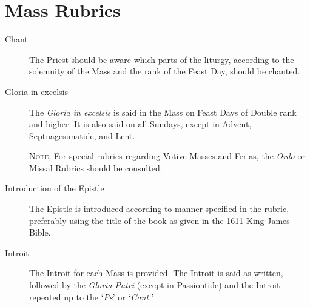 \section{Mass Rubrics}
\begin{description}
    \item[Chant] The Priest should be aware which parts of the liturgy, according to the solemnity of the Mass and the rank of the Feast Day, should be chanted.
    \item[Gloria in excelsis] The \emph{Gloria in excelsis} is said in the Mass on Feast Days of Double rank and higher. It is also said on all Sundays, except in Advent, Septuagesimatide, and Lent.\par
    \textsc{Note,} For special rubrics regarding Votive Masses and Ferias, the \emph{Ordo} or Missal Rubrics should be consulted.
    \item[Introduction of the Epistle] The Epistle is introduced according to manner specified in the rubric, preferably using the title of the book as given in the 1611 King James Bible.
    \item[Introit] The Introit for each Mass is provided. The Introit is said as written, followed by the \emph{Gloria Patri} (except in Passiontide) and the Introit repeated up to the `\emph{Ps}' or `\emph{Cant.}'

\end{description}
